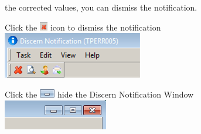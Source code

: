  the corrected values, you can dismiss the notification.
\vspace{1em}
\begin{description}
    \item Click the \includegraphics[height=1em, trim={0, 0px, 0, 4px}, clip]{graphics/discern_close} icon to dismiss the notification\\
    \vspace{.5em}
    \includegraphics[width=.5\linewidth, trim={0, 0px, 0, 0px}, clip]{graphics/discern_toolbar}
    \item Click the \includegraphics[height=1em, trim={0, 0px, 0, 0px}, clip]{graphics/discern_minimize} hide the Discern Notification Window\\
    \vspace{.5em}
    \includegraphics[width=.5\linewidth, trim={0, 0px, 0, 0px}, clip]{graphics/discern_window_buttons}
\end{description}

